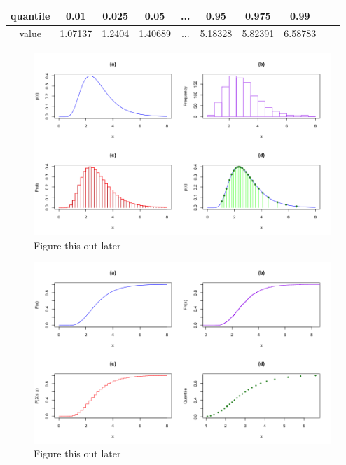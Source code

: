\documentclass{article}\usepackage[]{graphicx}\usepackage[]{color}
\begin{document}
\begin{table}[h!]
\centering
\label{tab:qstor}
 \begin{tabular}{|c|c|c|c|c|c|c|c|c|c|}
 \hline
    quantile & 0.01 & 0.025 & 0.05  & ...  & 0.95 & 0.975 & 0.99 \\ \hline
    value & 1.07137 & 1.2404 & 1.40689 & ... & 5.18328 &
    5.82391 & 6.58783 \\
 \hline
 \end{tabular}
\end{table}


\begin{figure}[htbp]
\centerline{\includegraphics[scale=.4]{dens_comp.png}}
\caption{Figure this out later}
\label{fig}
\end{figure}

\begin{figure}[htbp]
\centerline{\includegraphics[scale=.4]{cum_comp.png}}
\caption{Figure this out later}
\label{fig}
\end{figure}
\end{document}
